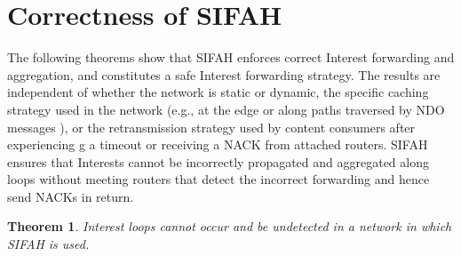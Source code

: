 \documentclass{ancs15-alternate}
\newtheorem{theorem}{Theorem}
\begin{document}
\section{Correctness of SIFAH}
\label{sec-correct}

The following theorems show that SIFAH enforces  correct Interest forwarding and aggregation, and constitutes a safe Interest forwarding strategy.
The results  are independent of whether the network is static or dynamic, the specific caching strategy used in the network (e.g., at the edge or along paths traversed by NDO messages \cite{caching}), or the retransmission strategy used by content consumers after experiencing g a timeout or receiving a NACK from attached routers. SIFAH ensures that Interests cannot be incorrectly propagated and aggregated along  loops without 
meeting routers that detect the incorrect forwarding and hence send  NACKs in return. 

\begin{theorem}
\label{theo3}
Interest loops cannot occur and be undetected in a network in which SIFAH is used.
\end{theorem}
\end{document}
